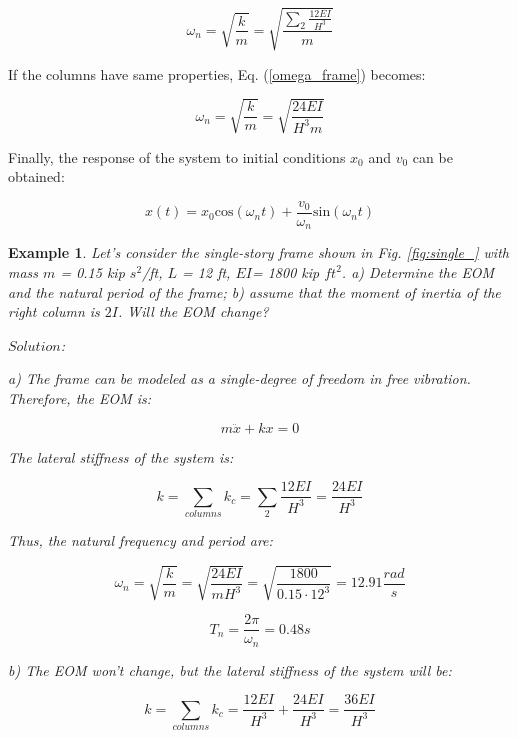 \documentclass[12pt,letter]{article}
\newtheorem{ex}{Example}
\numberwithin{ex}{section} %
\newenvironment{example}{\begin{mdframed}[middlelinewidth=0.5mm]\begin{ex}\normalfont}{\end{ex}\end{mdframed}}
\numberwithin{re}{section} %
\begin{document}
\begin{equation} \label{omega_frame}
\omega_n = \sqrt{\frac{k}{m}} = \sqrt{\frac{\sum_{2}^{} \frac{12EI} {H^3}}{m}}
\end{equation}

If the columns have same properties, Eq. (\ref{omega_frame}) becomes:

\begin{equation} \label{omega_frame}
\omega_n = \sqrt{\frac{k}{m}} = \sqrt{\frac{24EI}{H^3m}}
\end{equation}


Finally, the response of the system to initial conditions $x_0$ and ${v_0}$ can be obtained:

\begin{equation}
x(t) = x_0\text{cos}(\omega_n t) + \frac{v_0}{\omega_n}\text{sin}(\omega_n t)
\end{equation}	

\pagebreak


\begin{example}
	
Let's consider the single-story frame shown in Fig. \ref{fig:single_} with mass $m$ = 0.15 kip $s^2$/ft, $L$ = 12 ft, $EI$= 1800 kip $ft^2$. a) Determine the EOM and the natural period of the frame; b) assume that the moment of inertia of the right column is $2I$. Will the EOM change?

\vspace{1ex}

\noindent$Solution$:

\vspace{1ex}

a) The frame can be modeled as a single-degree of freedom in free vibration. Therefore, the EOM is:

\begin{equation}
	m \ddot{x} + k x = 0
\end{equation}

The lateral stiffness of the system is:

\begin{equation}
k = \sum_{columns}^{} k_c = \sum_{2}^{} \frac{12EI} {H^3} = \frac{24 EI}{H^3}
\end{equation}

Thus, the natural frequency and period are:

\begin{equation}
\omega_n = \sqrt{\frac{k}{m}} = \sqrt{\frac{24 EI}{m H^3}} = \sqrt{\frac{1800}{0.15 \cdot 12^3}} = 12.91 \frac{rad}{s}
\end{equation}

\begin{equation}
T_n =\frac{2 \pi}{\omega_n} = 0.48 s
\end{equation}

b) The EOM won't change, but the lateral stiffness of the system will be: 

\begin{equation}
k = \sum_{columns}^{} k_c = \frac{12EI} {H^3} + \frac{24EI} {H^3} = \frac{36 EI}{H^3}
\end{equation}

	
\end{example}
\end{document}
